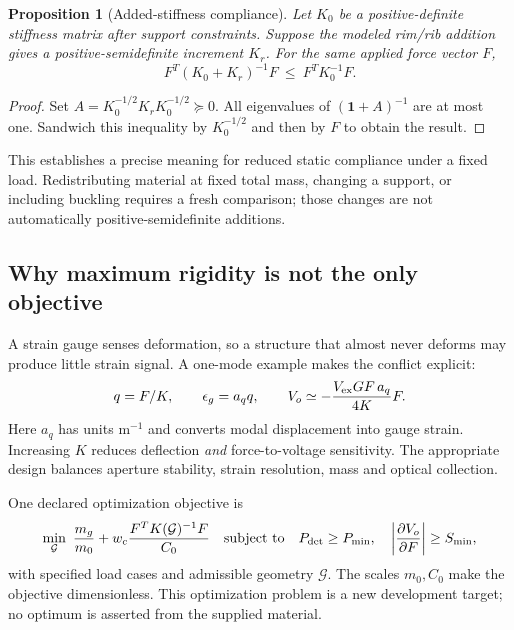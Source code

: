 \documentclass[10pt,a4paper]{article}
\numberwithin{equation}{section}
\newtheorem{proposition}{Proposition}[section]
\begin{document}
\begin{proposition}[Added-stiffness compliance]
Let $K_0$ be a positive-definite stiffness matrix after support constraints. Suppose the modeled rim/rib addition gives a positive-semidefinite increment $K_r$. For the same applied force vector $F$,
\begin{equation}
F^{\!T}(K_0+K_r)^{-1}F\ \le\ F^{\!T}K_0^{-1}F .
\end{equation}
\end{proposition}
\begin{proof}
Set $A=K_0^{-1/2}K_rK_0^{-1/2}\succeq0$. All eigenvalues of $(\bm1+A)^{-1}$ are at most one. Sandwich this inequality by $K_0^{-1/2}$ and then by $F$ to obtain the result.
\end{proof}

This establishes a precise meaning for reduced static compliance under a fixed load. Redistributing material at fixed total mass, changing a support, or including buckling requires a fresh comparison; those changes are not automatically positive-semidefinite additions.

\subsection*{Why maximum rigidity is not the only objective}
A strain gauge senses deformation, so a structure that almost never deforms may produce little strain signal. A one-mode example makes the conflict explicit:
\begin{equation}
q=F/K,\qquad \epsilon_g=a_q q,\qquad
V_o\simeq-\frac{V_{\rm ex}GF\,a_q}{4K}F.
\end{equation}
Here $a_q$ has units $\mathrm{m}^{-1}$ and converts modal displacement into gauge strain. Increasing $K$ reduces deflection \emph{and} force-to-voltage sensitivity. The appropriate design balances aperture stability, strain resolution, mass and optical collection.

One declared optimization objective is
\begin{equation}
\min_{\mathcal G}\ 
\frac{m_g}{m_0}+w_c\frac{F^TK(\mathcal G)^{-1}F}{C_0}
\quad\text{subject to}\quad
P_{\rm det}\ge P_{\min},\quad
\left|\frac{\partial V_o}{\partial F}\right|\ge S_{\min},
\end{equation}
with specified load cases and admissible geometry $\mathcal G$. The scales $m_0,C_0$ make the objective dimensionless. This optimization problem is a new development target; no optimum is asserted from the supplied material.
\end{document}
